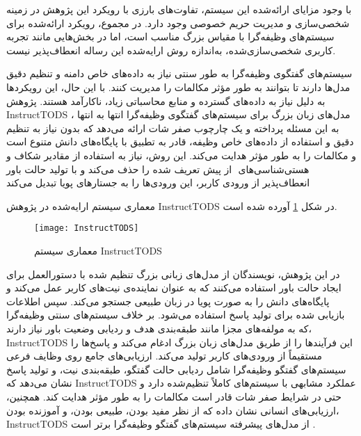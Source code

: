 با وجود مزایای ارائه‌شده این سیستم، تفاوت‌های بارزی با رویکرد این پژوهش در زمینه شخصی‌سازی و مدیریت حریم خصوصی وجود دارد. در مجموع، رویکرد ارائه‌شده برای سیستم‌های وظیفه‌گرا با مقیاس بزرگ مناسب است، اما در بخش‌هایی مانند تجربه کاربری شخصی‌سازی‌شده، به‌اندازه روش ارایه‌شده این رساله انعطاف‌پذیر نیست.


سیستم‌های گفتگوی وظیفه‌گرا به طور سنتی نیاز به داده‌های خاص دامنه و 
تنظیم دقیق مدل‌ها%
 دارند تا بتوانند به طور مؤثر مکالمات را مدیریت کنند. با این حال، این رویکردها به دلیل نیاز به داده‌های گسترده و منابع محاسباتی زیاد، ناکارآمد هستند. پژوهش InstructTODS مدل‌های زبان بزرگ برای سیستم‌های گفتگوی وظیفه‌گرا انتها به انتها
\cite{chung2023instructtods}
، به این مسئله پرداخته و یک چارچوب صفر شات ارائه می‌دهد که بدون نیاز به تنظیم دقیق و استفاده از داده‌های خاص وظیفه، قادر به تطبیق با پایگاه‌های دانش متنوع است و مکالمات را به طور مؤثر هدایت می‌کند. این روش، نیاز به استفاده از مقادیر شکاف و 
هستی‌شناسی‌های%
‌
 از پیش تعریف شده را حذف می‌کند و با تولید حالت باور انعطاف‌پذیر از ورودی کاربر، این ورودی‌ها را به جستارهای پویا تبدیل می‌کند%
\cite{madotto2021few}

معماری سیستم ارایه‌شده در پژوهش InstructTODS در شکل \ref{fig:InstructTODS} آورده شده است.

\begin{figure}[ht]
    \centerline{\texttt{[image: InstructTODS]}}
    \caption{معماری سیستم InstructTODS 
    \cite{chung2023instructtods}
    }
    \label{fig:InstructTODS}
\end{figure}


در این پژوهش، نویسندگان از مدل‌های زبانی بزرگ تنظیم شده با دستورالعمل برای ایجاد حالت باور استفاده می‌کنند که به عنوان نماینده‌ی نیت‌های کاربر عمل می‌کند و پایگاه‌های دانش را به صورت پویا در زبان طبیعی جستجو می‌کند. سپس اطلاعات بازیابی شده برای تولید پاسخ استفاده می‌شود. بر خلاف سیستم‌های سنتی وظیفه‌گرا که به مولفه‌های مجزا مانند طبقه‌بندی هدف و ردیابی وضعیت باور نیاز دارند، InstructTODS این فرآیندها را از طریق مدل‌های زبان بزرگ ادغام می‌کند و پاسخ‌ها را مستقیماً از ورودی‌های کاربر تولید می‌کند.
\newline
ارزیابی‌های جامع روی وظایف فرعی سیستم‌های گفتگو وظیفه‌گرا شامل ردیابی حالت گفتگو، طبقه‌بندی نیت، و تولید پاسخ نشان می‌دهد که InstructTODS عملکرد مشابهی با سیستم‌های 
کاملاً تنظیم‌شده%
 دارد و حتی در شرایط صفر شات قادر است مکالمات را به طور مؤثر هدایت کند. همچنین، ارزیابی‌های انسانی نشان داده که از نظر مفید بودن، طبیعی بودن، و آموزنده بودن، InstructTODS از مدل‌های پیشرفته سیستم‌های گفتگو وظیفه‌گرا برتر است%
\cite{madotto2021few}
.

